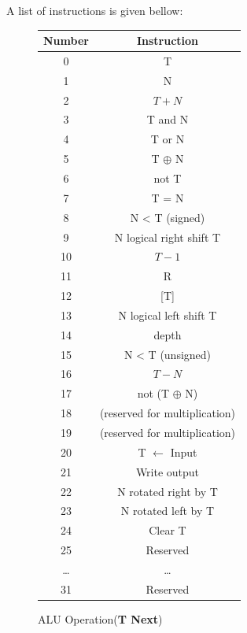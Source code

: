 \documentclass	[a4paper, 10pt]	{article}
\begin{document}
    A list of instructions is given bellow:
\begin{figure}[ht]
\hspace*{-1.5cm}
  \begin{minipage}[t]{0.45\linewidth}
    \centering

    \begin{tabular}{|c|c|}
      \hline
      \textbf{Number} & \textbf{Instruction}\\
      \hline
      0 & T\\
      \hline
      1 & N\\
      \hline
      2 & $T+N$\\
      \hline
      3 & T and N\\
      \hline
      4 & T or N\\
      \hline
      5 & T $\oplus$ N\\
      \hline
      6 & not T\\
      \hline
      7 & T = N\\
      \hline
      8 & N < T (signed)\\
      \hline
      9 & N logical right shift T\\
      \hline
      10 & $T-1$\\
      \hline
      11 & R\\
      \hline
      12 & [T]\\
      \hline
      13 & N logical left shift T\\
      \hline
      14 & depth\\
      \hline
      15 & N < T (unsigned)\\
      \hline
      16 & $T-N$\\
      \hline
      17 & not (T $\oplus$ N)\\
      \hline
      18 & (reserved for multiplication)\\
      \hline
      19 & (reserved for multiplication)\\
      \hline
      20 & T $\gets$ Input\\
      \hline
      21 & Write output\\
      \hline
      22 & N rotated right by T\\
      \hline
      23 & N rotated left by T\\
      \hline
      24 & Clear T\\
      \hline
      25 & Reserved\\
      \ldots & \ldots\\
      31 & Reserved\\
      \hline
    \end{tabular}
    \caption{ALU Operation(\textbf{T Next})}
    \label{fig:ALU instructions}
  \end{minipage}
  \hspace{1.0cm}
  \begin{minipage}[t]{0.45\linewidth}


\end{minipage}
\end{figure}
\end{document}
